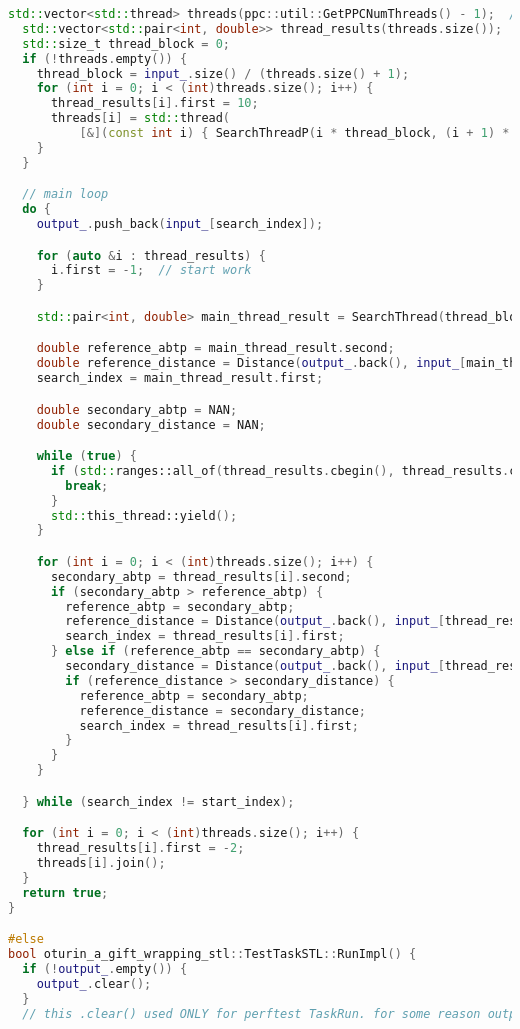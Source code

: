 \documentclass[12pt,a4paper]{extarticle}
\begin{document}
\begin{lstlisting}[language=C++]
  std::vector<std::thread> threads(ppc::util::GetPPCNumThreads() - 1);  // -1 because main thread will not be here
  std::vector<std::pair<int, double>> thread_results(threads.size());
  std::size_t thread_block = 0;
  if (!threads.empty()) {
    thread_block = input_.size() / (threads.size() + 1);
    for (int i = 0; i < (int)threads.size(); i++) {
      thread_results[i].first = 10;
      threads[i] = std::thread(
          [&](const int i) { SearchThreadP(i * thread_block, (i + 1) * thread_block, thread_results[i]); }, i);
    }
  }

  // main loop
  do {
    output_.push_back(input_[search_index]);

    for (auto &i : thread_results) {
      i.first = -1;  // start work
    }

    std::pair<int, double> main_thread_result = SearchThread(thread_block * threads.size(), input_.size());

    double reference_abtp = main_thread_result.second;
    double reference_distance = Distance(output_.back(), input_[main_thread_result.first]);
    search_index = main_thread_result.first;

    double secondary_abtp = NAN;
    double secondary_distance = NAN;

    while (true) {
      if (std::ranges::all_of(thread_results.cbegin(), thread_results.cend(), [](auto &i) { return i.first >= 0; })) {
        break;
      }
      std::this_thread::yield();
    }

    for (int i = 0; i < (int)threads.size(); i++) {
      secondary_abtp = thread_results[i].second;
      if (secondary_abtp > reference_abtp) {
        reference_abtp = secondary_abtp;
        reference_distance = Distance(output_.back(), input_[thread_results[i].first]);
        search_index = thread_results[i].first;
      } else if (reference_abtp == secondary_abtp) {
        secondary_distance = Distance(output_.back(), input_[thread_results[i].first]);
        if (reference_distance > secondary_distance) {
          reference_abtp = secondary_abtp;
          reference_distance = secondary_distance;
          search_index = thread_results[i].first;
        }
      }
    }

  } while (search_index != start_index);

  for (int i = 0; i < (int)threads.size(); i++) {
    thread_results[i].first = -2;
    threads[i].join();
  }
  return true;
}

#else
bool oturin_a_gift_wrapping_stl::TestTaskSTL::RunImpl() {
  if (!output_.empty()) {
    output_.clear();
  }
  // this .clear() used ONLY for perftest TaskRun. for some reason output_ has something in it


\end{lstlisting}
\end{document}
